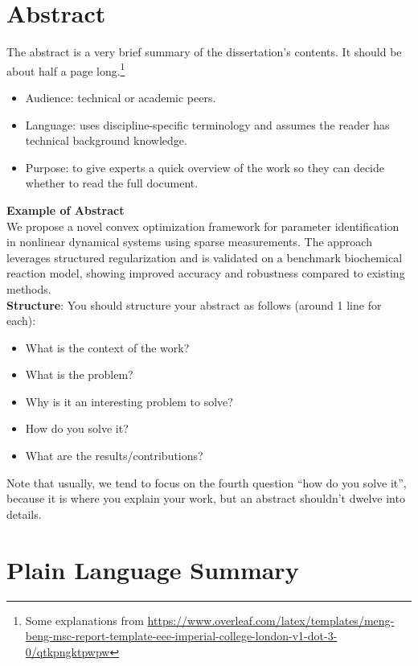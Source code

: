 \documentclass[10pt,a4paper]{article}
\newcommand\blankpage{
    \null
    \thispagestyle{empty}
    \newpage}
\begin{document}
\blankpage
\section*{Abstract}

The abstract is a very brief summary of the dissertation's contents. It should be about half a page long.\footnote{Some explanations from \url{https://www.overleaf.com/latex/templates/meng-beng-msc-report-template-eee-imperial-college-london-v1-dot-3-0/qtkpngktpwpw}}

\begin{itemize}
\item Audience: technical or academic peers.
\item Language: uses discipline-specific terminology and assumes the reader has technical background knowledge.
\item Purpose: to give experts a quick overview of the work so they can decide whether to read the full document.
\end{itemize}

\textbf{Example of Abstract}\\
We propose a novel convex optimization framework for parameter identification in nonlinear dynamical systems using sparse measurements. The approach leverages structured regularization and is validated on a benchmark biochemical reaction model, showing improved accuracy and robustness compared to existing methods.\\[0.5cm]

\textbf{Structure}: You should structure your abstract as follows (around 1 line for each):
\begin{itemize}
\item What is the context of the work?
\item What is the problem?
\item Why is it an interesting problem to solve?
\item How do you solve it?
\item What are the results/contributions?
\end{itemize}
Note that usually, we tend to focus on the fourth question ``how do you solve it'', because it is where you explain your work, but an abstract shouldn't dwelve into details.

\newpage
\blankpage

\section*{Plain Language Summary}
\end{document}
